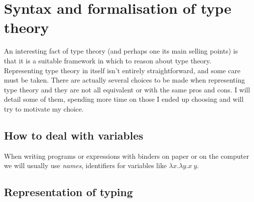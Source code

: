 \chapter{Syntax and formalisation of type theory}

An interesting fact of type theory (and perhaps one its main selling points) is
that it is a suitable framework in which to reason about type theory.
Representing type theory in itself isn't entirely straightforward, and some care
must be taken. There are actually several choices to be made when representing
type theory and they are not all equivalent or with the same pros and cons.
I will detail some of them, spending more time on those I ended up choosing
and will try to motivate my choice.

\section{How to deal with variables}

When writing programs or expressions with binders on paper or on the computer
we will usually use \emph{names}, identifiers for variables like
\(\lambda x. \lambda y. x\ y\).


\section{Representation of typing}

